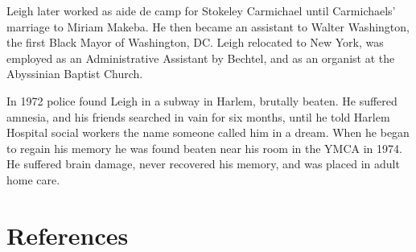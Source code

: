 Leigh later worked as aide de camp for Stokeley Carmichael until
Carmichaels' marriage to Miriam Makeba. He then became an assistant to
Walter Washington, the first Black Mayor of Washington, DC. Leigh
relocated to New York, was employed as an Administrative Assistant by
Bechtel, and as an organist at the Abyssinian Baptist Church.

In 1972 police found Leigh in a subway in Harlem, brutally beaten. He
suffered amnesia, and his friends searched in vain for six months, until
he told Harlem Hospital social workers the name someone called him in a
dream. When he began to regain his memory he was found beaten near his
room in the YMCA in 1974. He suffered brain damage, never recovered his
memory, and was placed in adult home care.

\section{References}\label{references}
